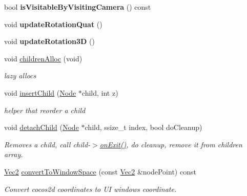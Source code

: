\begin{DoxyCompactItemize}
bool {\bfseries is\+Visitable\+By\+Visiting\+Camera} () const
\item 
\mbox{\label{classNode_aca86193f13f3d6c1772630b30e995681}} 
void {\bfseries update\+Rotation\+Quat} ()
\item 
\mbox{\label{classNode_a6837d39880dd37abab5ac55c1b0801f3}} 
void {\bfseries update\+Rotation3D} ()
\item 
\mbox{\label{classNode_a6aeb29ea076a2a5cf6fc40ec7b4348ca}} 
void \hyperlink{classNode_a6aeb29ea076a2a5cf6fc40ec7b4348ca}{children\+Alloc} (void)
\begin{DoxyCompactList}\small\item\em lazy allocs \end{DoxyCompactList}\item 
\mbox{\label{classNode_aeb54cf6025e99d8ac7f86c4549781fff}} 
void \hyperlink{classNode_aeb54cf6025e99d8ac7f86c4549781fff}{insert\+Child} (\hyperlink{classNode}{Node} $\ast$child, int z)
\begin{DoxyCompactList}\small\item\em helper that reorder a child \end{DoxyCompactList}\item 
\mbox{\label{classNode_a28508e2bfd951d040c84f26bc5ca8a15}} 
void \hyperlink{classNode_a28508e2bfd951d040c84f26bc5ca8a15}{detach\+Child} (\hyperlink{classNode}{Node} $\ast$child, ssize\+\_\+t index, bool do\+Cleanup)
\begin{DoxyCompactList}\small\item\em Removes a child, call child-\/$>$\hyperlink{classNode_ac83de835ea315e3179d4293acd8903ac}{on\+Exit()}, do cleanup, remove it from children array. \end{DoxyCompactList}\item 
\mbox{\label{classNode_a5714faff2a8e1c11d0c1063bbebb7e8e}} 
\hyperlink{classVec2}{Vec2} \hyperlink{classNode_a5714faff2a8e1c11d0c1063bbebb7e8e}{convert\+To\+Window\+Space} (const \hyperlink{classVec2}{Vec2} \&node\+Point) const
\begin{DoxyCompactList}\small\item\em Convert cocos2d coordinates to UI windows coordinate. \end{DoxyCompactList}\item 

\end{DoxyCompactItemize}
